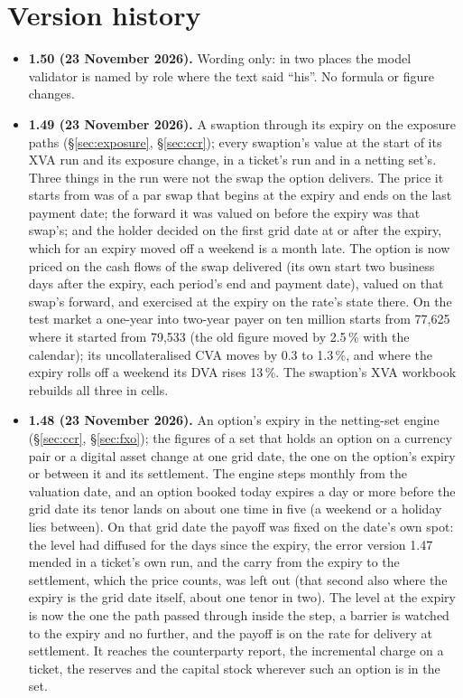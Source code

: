 \documentclass[11pt,a4paper]{article}
\let\plainsection\section
\renewcommand{\section}{\needspace{9\baselineskip}\plainsection}
\begin{document}
\section*{Version history}
{\small
\begin{itemize}[leftmargin=1.4em, itemsep=4pt]
\item \textbf{1.50 (23 November 2026).} Wording only: in two places the model validator is named by role where the text said ``his''. No formula or figure changes.
\item \textbf{1.49 (23 November 2026).} A swaption through its expiry on the exposure paths (\S\ref{sec:exposure}, \S\ref{sec:ccr}); every swaption's value at the start of its XVA run and its exposure change, in a ticket's run and in a netting set's. Three things in the run were not the swap the option delivers. The price it starts from was of a par swap that begins at the expiry and ends on the last payment date; the forward it was valued on before the expiry was that swap's; and the holder decided on the first grid date at or after the expiry, which for an expiry moved off a weekend is a month late. The option is now priced on the cash flows of the swap delivered (its own start two business days after the expiry, each period's end and payment date), valued on that swap's forward, and exercised at the expiry on the rate's state there. On the test market a one-year into two-year payer on ten million starts from 77,625 where it started from 79,533 (the old figure moved by 2.5\,\% with the calendar); its uncollateralised CVA moves by 0.3 to 1.3\,\%, and where the expiry rolls off a weekend its DVA rises 13\,\%. The swaption's XVA workbook rebuilds all three in cells.
\item \textbf{1.48 (23 November 2026).} An option's expiry in the netting-set engine (\S\ref{sec:ccr}, \S\ref{sec:fxo}); the figures of a set that holds an option on a currency pair or a digital asset change at one grid date, the one on the option's expiry or between it and its settlement. The engine steps monthly from the valuation date, and an option booked today expires a day or more before the grid date its tenor lands on about one time in five (a weekend or a holiday lies between). On that grid date the payoff was fixed on the date's own spot: the level had diffused for the days since the expiry, the error version 1.47 mended in a ticket's own run, and the carry from the expiry to the settlement, which the price counts, was left out (that second also where the expiry is the grid date itself, about one tenor in two). The level at the expiry is now the one the path passed through inside the step, a barrier is watched to the expiry and no further, and the payoff is on the rate for delivery at settlement. It reaches the counterparty report, the incremental charge on a ticket, the reserves and the capital stock wherever such an option is in the set.

\end{itemize}}
\end{document}
